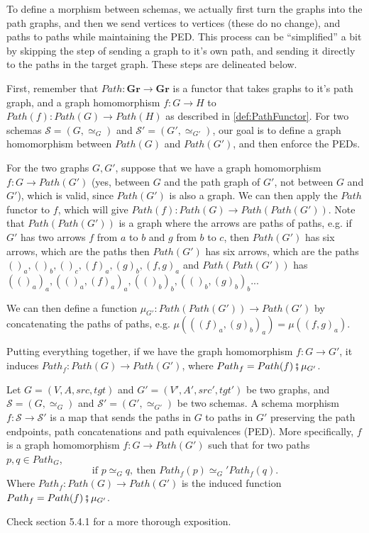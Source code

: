 To define a morphism between schemas, we actually first turn the graphs
into the path graphs, and then we send vertices to vertices (these do no change), and
paths to paths while maintaining the PED. This process can be ``simplified'' a bit
by skipping the step of sending a graph to it's own path, and sending it
directly to the paths in the target graph. These steps are delineated below.

First, remember that $Path:\mathbf{Gr} \to \mathbf{Gr}$ is a functor that takes
graphs to it's path graph, and a graph homomorphism $f:G\to H$ to $Path(f):Path(G) \to Path(H)$
as described in \ref{def:PathFunctor}.
For two schemas $\mathcal S = (G,\simeq_G)$ and $\mathcal S' = (G', \simeq_{G'})$,
our goal is to define a graph homomorphism between $Path(G)$ and $Path(G')$,
and then enforce the PEDs.

For the two graphs $G, G'$, suppose that we have
a graph homomorphism $f: G \to Path(G')$ (yes, between $G$ and the path graph of $G'$,
not between $G$ and $G'$), which is valid, since $Path(G')$ is also a graph.
We can then apply the $Path$ functor to $f$, which will give
$Path(f):Path(G) \to Path(Path(G'))$. Note that $Path(Path(G'))$ is a graph where
the arrows are paths of paths, e.g. if $G'$ has two arrows $f$ from $a$ to $b$ and
$g$ from $b$ to $c$, then $Path(G')$ has six arrows, which are the paths
then $Path(G')$ has six arrows, which are the paths
$()_a, ()_b, ()_c, (f)_a, (g)_b, (f,g)_a$ and $Path(Path(G'))$ has
$(()_a)_a, (()_a,(f)_a)_a, (()_b)_b, (()_b,(g)_b)_b ...$

We can then define a function $\mu_{G'}:Path(Path(G'))\to Path(G')$ by concatenating
the paths of paths, e.g. $\mu(((f)_a, (g)_b)_a) = \mu((f,g)_a)$.

Putting everything together, if we have the graph homomorphism $f:G\to G'$,
it induces $Path_f: Path(G) \to Path(G')$, where
$Path_f = Path(f) \fatsemi \mu_{G'}$.


\begin{definition}
  Let $G = (V,A,src,tgt)$ and $G'=(V',A',src',tgt')$ be two graphs, and
  $\mathcal S = (G,\simeq_G)$ and $\mathcal S' = (G', \simeq_{G'})$ be two schemas.
  A schema morphism $f:\mathcal S \to \mathcal S'$ is a map that sends
  the paths in $G$ to paths in $G'$ preserving the path endpoints, path concatenations
  and path equivalences (PED).
  More specifically, $f$ is a graph homomorphism $f:G \to Path(G')$
  such that for two paths $p,q \in Path_G$,
  \begin{displaymath}
    \text{if } p \simeq_G q, \ \text{then }  Path_f(p) \simeq_G' Path_f(q).
  \end{displaymath}
  Where $Path_f:Path(G) \to Path(G')$ is the induced function $Path_f = Path(f) \fatsemi \mu_{G'}$.

  Check \citet{spivak2014category} section 5.4.1 for a more thorough exposition.
\end{definition}


